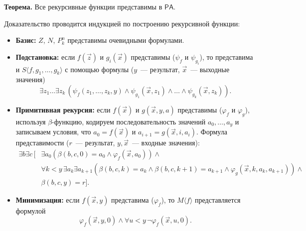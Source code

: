 \documentclass[10pt]{article}
\begin{document}
\textbf{Теорема.} Все рекурсивные функции представимы в $\mathsf{PA}$.

Доказательство проводится индукцией по построению рекурсивной функции:
\begin{itemize}
  \item \textbf{Базис:} $Z$, $N$, $P^n_k$ представимы очевидными формулами.
  \item \textbf{Подстановка:} если $f(\vec{z})$ и $g_i(\vec{x})$ представимы ($\psi_f$ и $\psi_{g_i}$), то представима и $S\langle f,g_1,\dots,g_k\rangle$ с помощью формулы ($y$~--- результат, $\vec{x}$~--- выходные значения)
  \[
  \exists z_1\dots\exists z_k\,(\psi_f(z_1,\dots,z_k,y)\land\psi_{g_1}(\vec{x},z_1)\land\dots\land\psi_{g_k}(\vec{x},z_k)).
  \]
  \item \textbf{Примитивная рекурсия:} если $f(\vec{x})$ и $g(\vec{x}, y, a)$ представимы ($\varphi_f$ и $\varphi_g$), используя $\beta$-функцию, кодируем последовательность значений $a_0,\dots,a_y$ и записываем условия, что $a_0=f(\vec{x})$ и $a_{i+1}=g(\vec{x},i,a_i)$. Формула представимости ($r$~--- результат, $y, \vec{x}$~--- входные значения):
  \begin{align*}
  \exists b\exists c\,\bigl[&\exists a_0(\beta(b,c,0)=a_0\land\varphi_f(\vec{x},a_0))\land \\
  & \forall k<y\,\exists a_k\exists a_{k+1}(\beta(b,c,k)=a_k\land\beta(b,c,k+1)=a_{k+1}\land\varphi_g(\vec{x},k,a_k,a_{k+1}))\land \\
  & \beta(b,c,y)=r\bigr].
  \end{align*}
  \item \textbf{Минимизация:} если $f(\vec{x},y)$ представима ($\varphi_f$), то $M\langle f\rangle$ представляется формулой
  \[
  \varphi_f(\vec{x},y,0)\land\forall u<y\,\neg\varphi_f(\vec{x},u,0).
  \]
\end{itemize}
\end{document}
